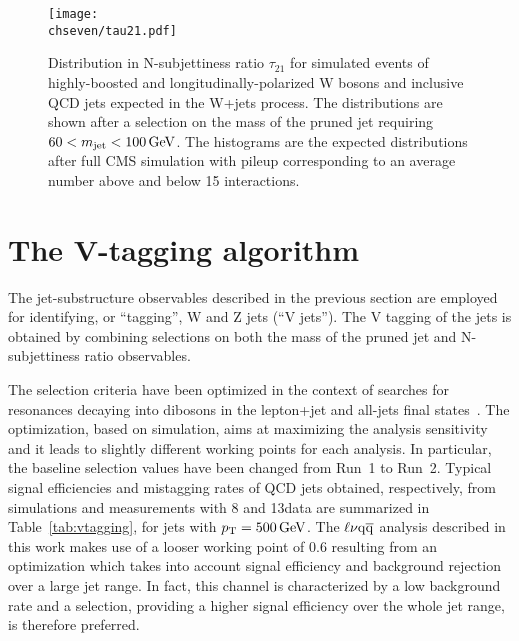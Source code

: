 \begin{figure}[!htb]
 \begin{center}
  \texttt{[image: \\chseven/tau21.pdf]}
 \end{center}
 \caption{\small Distribution in N-subjettiness ratio $\tau_{21}$ for simulated events of highly-boosted and longitudinally-polarized W bosons and inclusive QCD jets expected in the W+jets process. The distributions are shown after a selection on the mass of the pruned jet requiring $60 < m_{\text{jet}} < 100\,\text{Ge\hspace{-.08em}V}$. The histograms are the expected distributions after full CMS simulation with pileup corresponding to an average number above and below 15 interactions.
 }
 \label{fig:tau21}
\end{figure}

\section{The V-tagging algorithm}
\label{sec:vtagging}

The jet-substructure observables described in the previous section are employed for identifying, or ``tagging'', W and Z jets (``V jets''). The V tagging of the jets is obtained by combining selections on both the mass of the pruned jet \mJ and N-subjettiness ratio \nsubj observables. %

The selection criteria have been optimized in the context of searches for resonances decaying into dibosons in the lepton+jet and all-jets final states~\cite{Khachatryan:2014gha,Khachatryan:2014hpa,CMS-PAS-EXO-15-002}. The optimization, based on simulation, aims at maximizing the analysis sensitivity and it leads to slightly different working points for each analysis. In particular, the baseline selection values have been changed from Run~1 to Run~2. Typical signal efficiencies and mistagging rates of QCD jets obtained, respectively, from simulations and measurements with 8 and 13\TeV data are summarized in Table~\ref{tab:vtagging}, for jets with $p_{\mathrm{T}} = 500\,\text{Ge\hspace{-.08em}V}$.
The $\ell\nu\mathrm{q}\overline{\mathrm{q}}$ analysis described in this work makes use of a looser \nsubj working point of 0.6 resulting from an optimization which takes into account signal efficiency and background rejection over a large jet \pt range.
In fact, this channel is characterized by a low background rate and a \nsubj selection, providing a higher signal efficiency over the whole jet \pt range, is therefore preferred.\\

